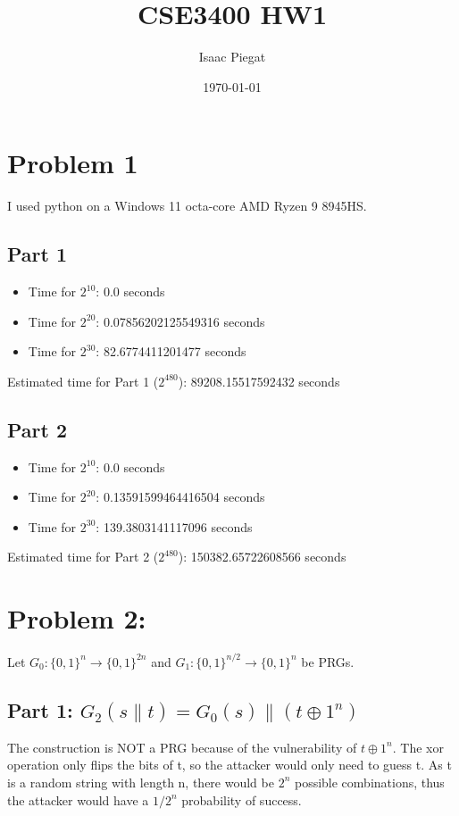 \documentclass{article} %
\title{CSE3400 HW1} %
\author{Isaac Piegat} %
\date{\today} %
\begin{document}
\maketitle %

\section{Problem 1} %
I used python on a Windows 11 octa-core AMD Ryzen 9 8945HS. 

\subsection{Part 1} %
\begin{itemize}
    \item Time for $2^{10}$: 0.0 seconds 
    \item Time for $2^{20}$: 0.07856202125549316 seconds
    \item Time for $2^{30}$: 82.6774411201477 seconds
\end{itemize}

Estimated time for Part 1 ($2^{480}$): 89208.15517592432 seconds

\subsection{Part 2}
\begin{itemize}
    \item Time for $2^{10}$: 0.0 seconds
    \item Time for $2^{20}$: 0.13591599464416504 seconds
    \item Time for $2^{30}$: 139.3803141117096 seconds
\end{itemize}

Estimated time for Part 2 ($2^{480}$): 150382.65722608566 seconds

\section{Problem 2:}
Let \( G_0: \{0,1\}^n \to \{0,1\}^{2n} \) and \( G_1: \{0,1\}^{n/2} \to \{0,1\}^n \) be PRGs.

\subsection{Part 1: \(G_2(s \parallel t) = G_0(s) \parallel (t \oplus 1^n)\)}
The construction is NOT a PRG because of the vulnerability of \(t \oplus 1^n\). The xor operation only flips the bits of t, so the attacker would only need to guess t. As t is a random string with length n, there would be \(2^n\) possible combinations, thus the attacker would have a \(1/2^n\) probability of success. 
\end{document}

